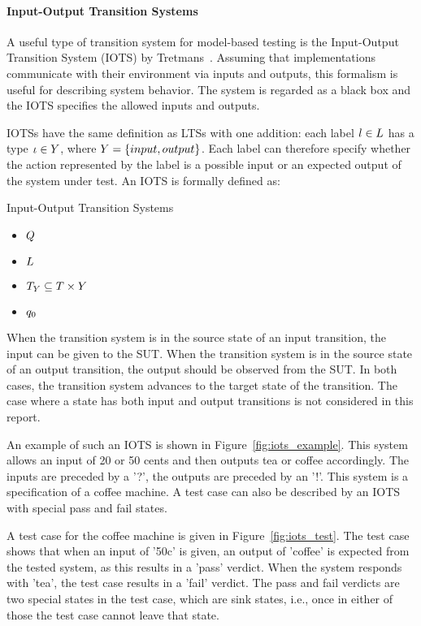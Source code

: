 \paragraph*{Input-Output Transition Systems}
A useful type of transition system for model-based testing is the Input-Output Transition System (IOTS) by Tretmans~\cite{Tretmans:testgeneration}. Assuming that implementations communicate with their environment via inputs and outputs, this formalism is useful for describing system behavior. The system is regarded as a black box and the IOTS specifies the allowed inputs and outputs.

IOTSs have the same definition as LTSs with one addition: each label $l \in L$ has a type $\iota \in Y$, where $Y = \{input, output\}$. Each label can therefore specify whether the action represented by the label is a possible input or an expected output of the system under test. An IOTS is formally defined as:
\vspace{5px}
\begin{definition} Input-Output Transition Systems
\begin{itemize}
\item $Q$
\item $L$
\item {}$T_{Y} \subseteq T \times Y$
\item $q_0$
\end{itemize}
\end{definition}
When the transition system is in the source state of an input transition, the input can be given to the SUT. When the transition system is in the source state of an output transition, the output should be observed from the SUT. In both cases, the transition system advances to the target state of the transition. The case where a state has both input and output transitions is not considered in this report.

An example of such an IOTS is shown in Figure~\ref{fig:iots_example}. This system allows an input of 20 or 50 cents and then outputs tea or coffee accordingly. The inputs are preceded by a '?', the outputs are preceded by an '!'. This system is a specification of a coffee machine. A test case can also be described by an IOTS with special pass and fail states. 

A test case for the coffee machine is given in Figure~\ref{fig:iots_test}. The test case shows that when an input of '50c' is given, an output of 'coffee' is expected from the tested system, as this results in a 'pass' verdict. When the system responds with 'tea', the test case results in a 'fail' verdict. The pass and fail verdicts are two special states in the test case, which are sink states, i.e., once in either of those the test case cannot leave that state. 

